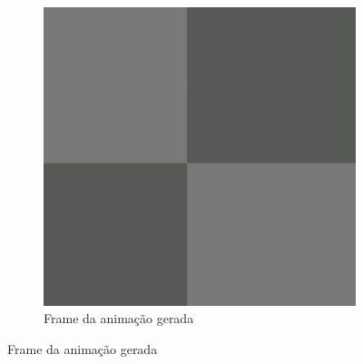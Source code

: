 \begin{figure}[htbp]
\begin{subfigure}{0.35\linewidth}
        \includegraphics[width=1\linewidth]{figs/pixelLab/dia3/print3.PNG}
        \caption{\small Frame da animação gerada}
        \label{fig:pixelLabAnimacao2b}
    \end{subfigure}
\end{figure}

